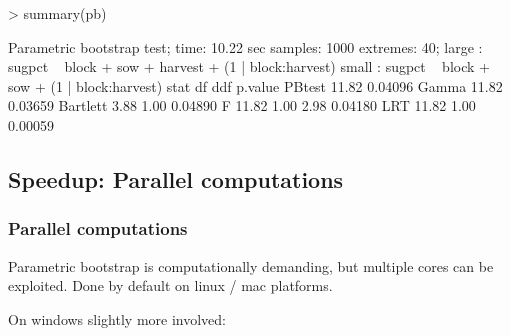 \begin{sframe}
\begin{Schunk}
\begin{Sinput}
> summary(pb)
\end{Sinput}
\begin{Soutput}
Parametric bootstrap test; time: 10.22 sec
samples: 1000 extremes: 40;
large : sugpct ~ block + sow + harvest + (1 | block:harvest)
small : sugpct ~ block + sow + (1 | block:harvest)
          stat    df  ddf p.value
PBtest   11.82            0.04096
Gamma    11.82            0.03659
Bartlett  3.88  1.00      0.04890
F        11.82  1.00 2.98 0.04180
LRT      11.82  1.00      0.00059
\end{Soutput}
\end{Schunk}
  \end{sframe}


\subsection{Speedup: Parallel computations}

\begin{sframe}
\frametitle{Parallel computations}

Parametric bootstrap is computationally demanding, but multiple cores can be exploited. Done by default on linux / mac platforms. 

On windows slightly more involved:

  


\end{sframe}



